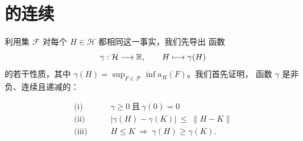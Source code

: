 
\section{\trActionSpectrum{}\trBundle{}的连续\trSection}
\label{sec:continuous-section}

%

利用\trMinimax{}集 $\mathcal{F}$ 对每个 $H\in\mathcal{H}$ 都相同这一事实，我们先导出%
函数
\[
\gamma:\mathcal{H}\longrightarrow\mathbb{R},\qquad H\longmapsto\gamma(H)
\]
的若干性质，其中 $\gamma(H)=\sup_{F\in\mathcal{F}}\inf a_{H}(F)$。我们首先证明，%
函数 $\gamma$ 是非负、连续且\trMonotone{}递减的：

\begin{proposition}\label{prop:gamma-h-properties}
\begin{align*}
\text{(i)}\qquad& \gamma\geq0\ \text{且}\ \gamma(0)=0\\
\text{(ii)}\qquad& \bigl\lvert\gamma(H)-\gamma(K)\bigr\rvert\ \leq\ \lVert H-K\rVert\\
\text{(iii)}\qquad& H\leq K\ \Rightarrow\ \gamma(H)\geq\gamma(K).
\end{align*}
\end{proposition}


